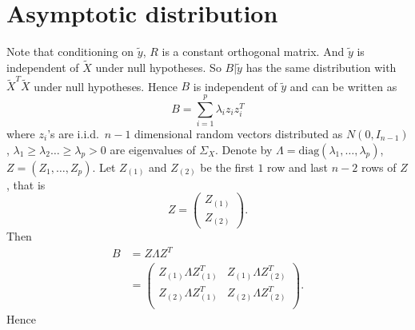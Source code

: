 \documentclass[review]{elsarticle}
\theoremstyle{plain}
\theoremstyle{definition}
\theoremstyle{remark}
\begin{document}
\section{Asymptotic distribution}
Note that conditioning on $\tilde{y}$, $R$ is a constant orthogonal matrix.
And $\tilde{y}$ is independent of $\tilde{X}$ under null hypotheses.
So  $B|\tilde{y}$ has the same distribution with $\tilde{X}^T \tilde{X}$ under null hypotheses.
Hence $B$ is independent of $\tilde{y}$ and can be written as
    \begin{equation}\label{Xdis}
    B=\sum_{i=1}^p \lambda_i z_i z_i^T
    \end{equation}
where $z_i$'s are i.i.d.\ $n-1$ dimensional random vectors  distributed as $N(0,I_{n-1})$, $\lambda_1\geq \lambda_2\ldots \geq \lambda_p>0$ are eigenvalues of $\Sigma_X$. 
Denote by $\Lambda=\textrm{diag} (\lambda_1,\ldots,\lambda_p)$, $Z=(Z_1,\ldots,Z_p)$. Let $Z_{(1)}$ and $Z_{(2)}$ be the first $1$ row and last $n-2$ rows of $Z$, that is
\[
    Z=\begin{pmatrix} 
        Z_{(1)}\\
        Z_{(2)}
    \end{pmatrix}.
    \]
Then
\begin{equation}
    \begin{aligned}
        B&=Z\Lambda Z^T\\
        &=\begin{pmatrix}
            Z_{(1)}\Lambda Z_{(1)}^T & Z_{(1)}\Lambda Z_{(2)}^T\\
            Z_{(2)}\Lambda Z_{(1)}^T & Z_{(2)}\Lambda Z_{(2)}^T\\
        \end{pmatrix}.
    \end{aligned}
\end{equation}
Hence
\end{document}
